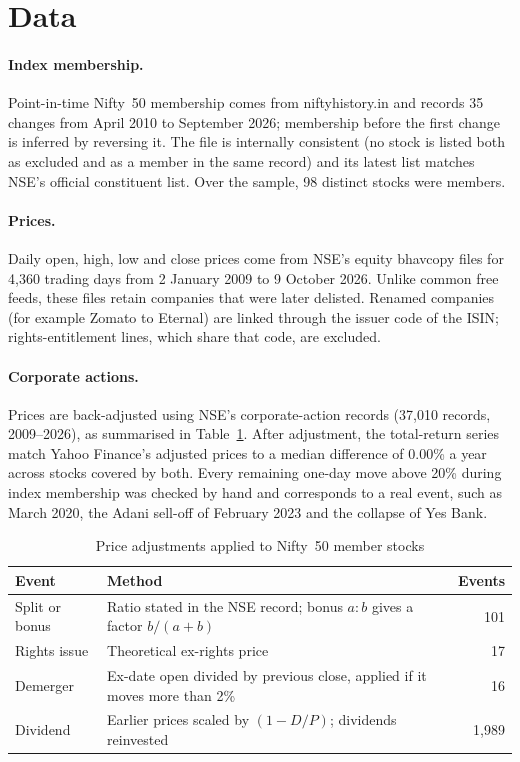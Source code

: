 \documentclass[11pt]{article}
\begin{document}

\section{Data}

\paragraph{Index membership.} Point-in-time Nifty~50 membership comes from niftyhistory.in and records 35 changes
from April 2010 to September 2026; membership before the first change is inferred by reversing it. The file is
internally consistent (no stock is listed both as excluded and as a member in the same record) and its latest
list matches NSE's official constituent list. Over the sample, 98 distinct stocks were members.

\paragraph{Prices.} Daily open, high, low and close prices come from NSE's equity bhavcopy files for 4,360
trading days from 2 January 2009 to 9 October 2026. Unlike common free feeds, these files retain companies that
were later delisted. Renamed companies (for example Zomato to Eternal) are linked through the issuer code of the
ISIN; rights-entitlement lines, which share that code, are excluded.

\paragraph{Corporate actions.} Prices are back-adjusted using NSE's corporate-action records (37,010 records,
2009--2026), as summarised in Table~\ref{tab:adjust}. After adjustment, the total-return series match Yahoo
Finance's adjusted prices to a median difference of 0.00\% a year across stocks covered by both. Every remaining
one-day move above 20\% during index membership was checked by hand and corresponds to a real event, such as
March 2020, the Adani sell-off of February 2023 and the collapse of Yes Bank.

\begin{table}[ht]
\centering
\caption{Price adjustments applied to Nifty~50 member stocks}
\label{tab:adjust}
\small
\begin{tabularx}{\textwidth}{lXr}
\toprule
Event & Method & Events \\
\midrule
Split or bonus & Ratio stated in the NSE record; bonus $a{:}b$ gives a factor $b/(a+b)$ & 101 \\
Rights issue & Theoretical ex-rights price & 17 \\
Demerger & Ex-date open divided by previous close, applied if it moves more than 2\% & 16 \\
Dividend & Earlier prices scaled by $(1 - D/P)$; dividends reinvested & 1,989 \\
\bottomrule
\end{tabularx}
\end{table}
\end{document}
